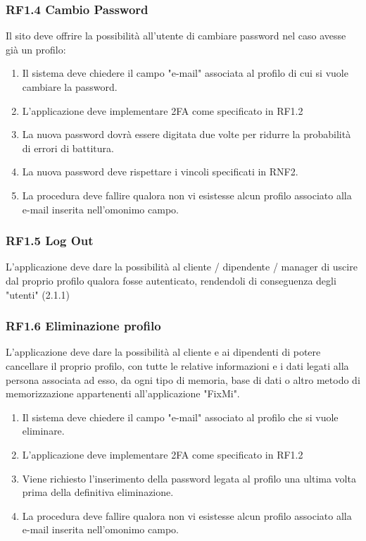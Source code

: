 \documentclass{report}
\begin{document}
\subsubsection*{RF1.4 Cambio Password}
Il sito deve offrire la possibilità all'utente di cambiare password nel caso avesse già un profilo:
\begin{enumerate}
	
	\item Il sistema deve chiedere il campo "e-mail" associata al profilo di cui si vuole cambiare la password.
	\item L'applicazione deve implementare 2FA come specificato in RF1.2
	\item La nuova password dovrà essere digitata due volte per ridurre la probabilità di errori di battitura.
	\item La nuova password deve rispettare i vincoli specificati in RNF2.
	\item La procedura deve fallire qualora non vi esistesse alcun profilo associato alla e-mail inserita nell'omonimo campo.
	
\end{enumerate}

\subsubsection{RF1.5 Log Out}

L'applicazione deve dare la possibilità al cliente / dipendente / manager di uscire dal proprio profilo qualora fosse autenticato, rendendoli di conseguenza degli "utenti" (2.1.1)

\subsubsection{RF1.6 Eliminazione profilo}

L'applicazione deve dare la possibilità al cliente e ai dipendenti di potere cancellare il proprio profilo, con tutte le relative informazioni e i dati legati alla persona associata ad esso, da ogni tipo di memoria, base di dati o altro metodo di memorizzazione appartenenti all'applicazione "FixMi".

\begin{enumerate}
	\item Il sistema deve chiedere il campo "e-mail" associato al profilo che si vuole eliminare.
	\item L'applicazione deve implementare 2FA come specificato in RF1.2
	\item Viene richiesto l'inserimento della password legata al profilo una ultima volta prima della definitiva eliminazione.
	\item La procedura deve fallire qualora non vi esistesse alcun profilo associato alla e-mail inserita nell'omonimo campo.
\end{enumerate}
\end{document}
